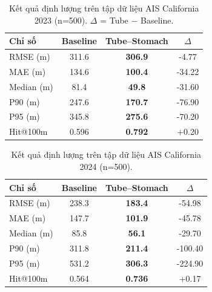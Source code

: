 \documentclass{IEEEtran}
\begin{document}
\vspace{-2pt}
\begin{table}[H]
\centering
\renewcommand{\arraystretch}{1.2}
\caption{Kết quả định lượng trên tập dữ liệu AIS California 2023 (n=500).
$\Delta$ = Tube $-$ Baseline.}
\label{tab:point-ca-2023}
\begin{tabular}{l
                S[table-format=3.1]
                S[table-format=3.1]
                S[table-format=+3.2]}
\toprule
Chỉ số & {Baseline} & {Tube--Stomach} & {$\Delta$} \\
\midrule
RMSE (m)    & 311.6 & \bfseries 306.9 & -4.77 \\
MAE (m)     & 134.6 & \bfseries 100.4 & -34.22 \\
Median (m)  &  81.4 & \bfseries  49.8 & -31.60 \\
P90 (m)     & 247.6 & \bfseries 170.7 & -76.90 \\
P95 (m)     & 345.8 & \bfseries 275.6 & -70.20 \\
Hit@100m    & 0.596 & \bfseries 0.792 & +0.20 \\
\bottomrule
\end{tabular}
\end{table}

\vspace{-2pt}
\begin{table}[H]
\centering
\renewcommand{\arraystretch}{1.2}
\caption{Kết quả định lượng trên tập dữ liệu AIS California 2024 (n=500).}
\label{tab:point-ca-2024}
\begin{tabular}{l
                S[table-format=3.1]
                S[table-format=3.1]
                S[table-format=+3.2]}
\toprule
Chỉ số & {Baseline} & {Tube--Stomach} & {$\Delta$} \\
\midrule
RMSE (m)    & 238.3 & \bfseries 183.4 & -54.98 \\
MAE (m)     & 147.7 & \bfseries 101.9 & -45.78 \\
Median (m)  &  85.8 & \bfseries  56.1 & -29.70 \\
P90 (m)     & 311.8 & \bfseries 211.4 & -100.40 \\
P95 (m)     & 531.2 & \bfseries 306.3 & -224.90 \\
Hit@100m    & 0.564 & \bfseries 0.736 & +0.17 \\
\bottomrule
\end{tabular}
\end{table}
\end{document}
